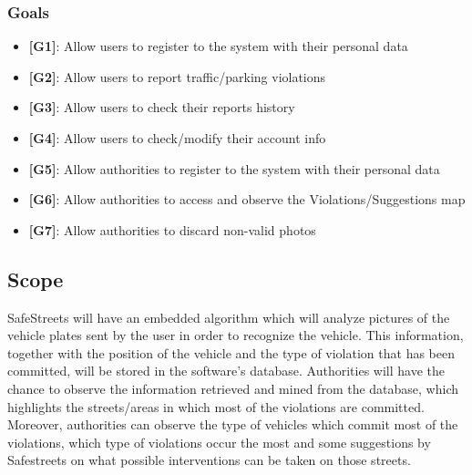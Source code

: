 \documentclass[12pt,a4paper]{article}
\begin{document}
\subsubsection{Goals}
\begin{itemize}
\item {\textbf[}\textbf{G1}{\textbf]}: Allow users to register to the system with their personal data
\item {\textbf[}\textbf{G2}{\textbf]}: Allow users to report traffic/parking violations 
\item {\textbf[}\textbf{G3}{\textbf]}: Allow users to check their reports history
\item {\textbf[}\textbf{G4}{\textbf]}: Allow users to check/modify their account info
\item {\textbf[}\textbf{G5}{\textbf]}: Allow authorities to register to the system with their personal data
\item {\textbf[}\textbf{G6}{\textbf]}: Allow authorities to access and observe the Violations/Suggestions map
\item {\textbf[}\textbf{G7}{\textbf]}: Allow authorities to discard non-valid photos
\end{itemize}
\subsection{Scope}
SafeStreets will have an embedded algorithm which will analyze pictures of the vehicle plates sent by the user in order to recognize the vehicle. This information, together with the position of the vehicle and the type of violation that has been committed, will be stored in the software's database.
\newline
Authorities will have the chance to observe the information retrieved and mined from the database, which highlights the streets/areas in which most of the violations are committed. \\ Moreover, authorities can observe the type of vehicles which commit most of the violations, which type of violations occur the most and some suggestions by Safestreets on what possible interventions can be taken on those streets.
\end{document}
